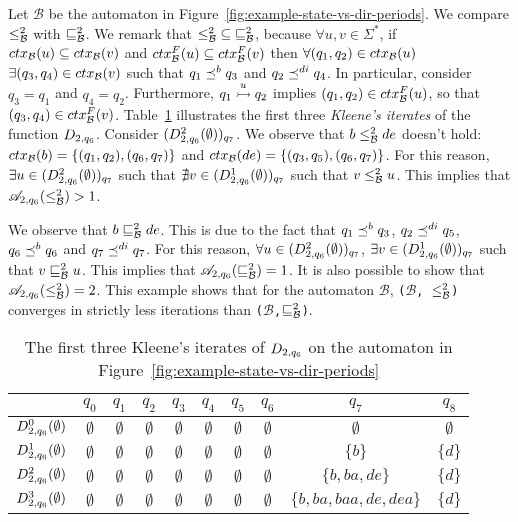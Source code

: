 \begin{example}
Let $\mathcal{B}$ be the automaton in
Figure~\ref{fig:example-state-vs-dir-periods}.
We compare $\leq^2_{\mathcal{B}}$ with $\sqsubseteq_{\mathcal{B}}^{2}$.
We remark that $\mathord{\leq^2_{\mathcal{B}}} \subseteq \mathord{\sqsubseteq_{\mathcal{B}}^{2}}$,
because $\forall u,v \in \Sigma^*$,
if $ctx_{\mathcal{B}}(u) \subseteq ctx_{\mathcal{B}}(v)$ and $ctx^F_{\mathcal{B}}(u) \subseteq ctx^F_{\mathcal{B}}(v)$ then
$\forall (q_1,q_2) \in ctx_{\mathcal{B}}(u)$ $\exists (q_3,q_4) \in ctx_{\mathcal{B}}(v)$
such that $q_1 \preceq^b q_3$ and $q_2 \preceq^{di} q_4$.
In particular, consider $q_3 = q_1$ and $q_4 = q_2$.
Furthermore, $q_1 \overset{u}{\rightarrowtail} q_2$ implies $(q_1,q_2) \in ctx^F_{\mathcal{B}}(u)$,
so that $(q_3,q_4) \in ctx^F_{\mathcal{B}}(v)$.
Table~\ref{table:D_2-example1} illustrates the first three \emph{Kleene's iterates}
of the function $D_{2,q_6}$.
Consider $(D_{2,q_6}^{2}(\emptyset))_{q_7}$.
We observe that $b \leq^2_{\mathcal{B}} de$ doesn't hold:
$ctx_{\mathcal{B}}(b) = \{(q_1,q_2), (q_6,q_7)\}$ and $ctx_{\mathcal{B}}(de) = \{(q_3,q_5), (q_6,q_7)\}$.
For this reason, $\exists u \in (D_{2,q_6}^{2}(\emptyset))_{q_7}$ such that
$\nexists v \in (D_{2,q_6}^{1}(\emptyset))_{q_7}$ such that $v \leq^2_{\mathcal{B}} u$.
This implies that $\mathscr{A}_{2, q_6}(\leq^2_{\mathcal{B}}) > 1$.

We observe that $b \sqsubseteq_{\mathcal{B}}^{2} de$.
This is due to the fact that $q_1 \preceq^b q_3$, $q_2 \preceq^{di} q_5$, $q_6 \preceq^b q_6$
and $q_7 \preceq^{di} q_7$.
For this reason,
$\forall u \in (D_{2,q_6}^{2}(\emptyset))_{q_7}$, $\exists v \in (D_{2,q_6}^{1}(\emptyset))_{q_7}$
such that $v \sqsubseteq_{\mathcal{B}}^{2} u$.
This implies that $\mathscr{A}_{2, q_6}(\sqsubseteq_{\mathcal{B}}^{2}) = 1$.
It is also possible to show that $\mathscr{A}_{2, q_6}(\leq^2_{\mathcal{B}}) = 2$.
This example shows that for the automaton $\mathcal{B}$,
\texttt{($\mathcal{B}$, $\leq^2_{\mathcal{B}}$)} converges in strictly less iterations
than \texttt{($\mathcal{B}$,$\sqsubseteq_{\mathcal{B}}^{2}$)}.
\end{example}

\begin{table}[h]
\centering
\begin{tabular}{ c | c | c | c | c | c | c | c | c | c}
 & $q_0$ & $q_1$ & $q_2$ & $q_3$ & $q_4$ & $q_5$ & $q_6$ & $q_7$ & $q_8$\\
\hline
$D_{2,q_6}^{0}(\emptyset)$ & $\emptyset$ & $\emptyset$ & $\emptyset$ & $\emptyset$ & $\emptyset$ & $\emptyset$ & $\emptyset$ & $\emptyset$ & $\emptyset$\\
$D_{2,q_6}^{1}(\emptyset)$ & $\emptyset$ & $\emptyset$ & $\emptyset$ & $\emptyset$ & $\emptyset$ & $\emptyset$ & $\emptyset$ & $\{b\}$ & $\{d\}$\\
$D_{2,q_6}^{2}(\emptyset)$ & $\emptyset$ & $\emptyset$ & $\emptyset$ & $\emptyset$ & $\emptyset$ & $\emptyset$ & $\emptyset$ & $\{b,ba,de\}$ & $\{d\}$\\
$D_{2,q_6}^{3}(\emptyset)$ & $\emptyset$ & $\emptyset$ & $\emptyset$ & $\emptyset$ & $\emptyset$ & $\emptyset$ & $\emptyset$ & $\{b,ba,baa,de,dea\}$ & $\{d\}$\\
\end{tabular}
\caption{The first three Kleene's iterates of $D_{2,q_6}$ on the automaton in
Figure~\ref{fig:example-state-vs-dir-periods}}
\label{table:D_2-example1}
\end{table}

